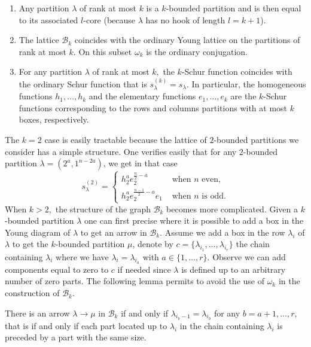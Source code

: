 \documentclass[ALCO,ThmDefs,Unicode,epreuves]{cedram}
\begin{document}
\begin{enumerate}
\item Any partition $\lambda$ of rank at most $k$ is a $k$-bounded partition
and is then equal to its associated $l$-core (because $\lambda$ has no hook of
length $l=k+1$).

\item The lattice $\mathcal{B}_{k}$ coincides with the ordinary Young lattice
on the partitions of rank at most $k$. On this subset $\omega_{k}$ is the
ordinary conjugation.

\item For any partition $\lambda$ of rank at most $k,$ the $k$-Schur function
coincides with the ordinary Schur function that is $s_{\lambda}^{(k)}%
=s_{\lambda}$. In particular, the homogeneous functions $h_{1},\ldots,h_{k}$
and the elementary functions $e_{1},\ldots,e_{k}$ are the $k$-Schur functions
corresponding to the rows and columns partitions with at most $k$ boxes, respectively.
\end{enumerate}

The $k=2$ case is easily tractable because the lattice of $2$-bounded
partitions we consider has a simple structure. One verifies easily that for
any $2$-bounded partition $\lambda=(2^{a},1^{n-2a})$, we get in that case
\[
s_{\lambda}^{(2)}=
\begin{cases}
h_{2}^{a}e_{2}^{\frac{n}{2}-a}&\text{ when }n\text{ even,}\\[4pt]
h_{2}^{a}e_{2}^{\frac{n-1}{2}-a}e_{1}&\text{ when }n\text{ is odd.}%
\end{cases}
\]
When $k>2,$ the structure of the graph $\mathcal{B}_{k}$ becomes more
complicated. Given a $k$-bounded partition $\lambda$ one can first precise
where it is possible to add a box in the Young diagram of $\lambda$ to get an
arrow in $\mathcal{B}_{k}$. Assume we add a box in the row $\lambda_{i}$ of
$\lambda$ to get the $k$-bounded partition $\mu$, denote by $c=\{\lambda
_{i_{1}},\ldots,\lambda_{i_{r}}\}$ the chain containing $\lambda_{i}$ where we
have $\lambda_{i}=\lambda_{i_{a}}$ with $a\in\{1,\ldots,r\}$. Observe we can
add components equal to zero to $c$ if needed since $\lambda$ is defined up to
an arbitrary number of zero parts. The following lemma permits to avoid the
use of $\omega_{k}$ in the construction of $\mathcal{B}_{k}$.

\begin{lemma}
\label{conditionArrow} There is an arrow $\lambda\rightarrow\mu$ in
$\mathcal{B}_{k}$ if and only if $\lambda_{i_{b}-1}=\lambda_{i_{b}}$ for any
$b=a+1,\ldots,r,$ that is if and only if each part located up to $\lambda_{i}$
in the chain containing $\lambda_{i}$ is preceded by a part with the same size.
\end{lemma}
\end{document}
